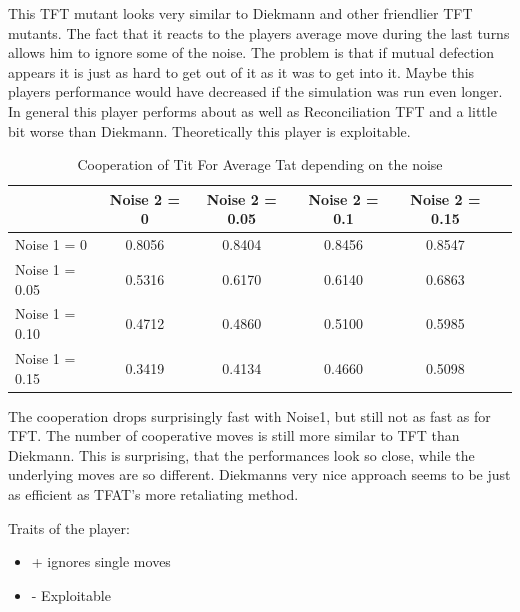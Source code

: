 \documentclass[11pt,twoside]{article}
\begin{document}
This TFT mutant looks very similar to Diekmann and other friendlier TFT mutants. The fact that it reacts to the players average move during the last turns allows him to ignore some of the noise. The problem is that if mutual defection appears it is just as hard to get out of it as it was to get into it. Maybe this players performance would have decreased if the simulation was run even longer. In general this player performs about as well as Reconciliation TFT and a little bit worse than Diekmann. Theoretically this player is exploitable. 

\begin{table}[h]
 \begin{center}
\caption{Cooperation of Tit For Average Tat depending on the noise} \vspace{3mm}
\begin{tabular}{|l|c|c|c|c|c|}
\hline
   	& Noise 2 = 0 & Noise 2 = 0.05& Noise 2 = 0.1& Noise 2 = 0.15 \\
  \hline
  Noise 1 = 0 	&    0.8056  &  0.8404  &  0.8456  &  0.8547 \\
 \hline
  Noise 1 = 0.05	 &     0.5316  &  0.6170 &   0.6140   & 0.6863 \\
 \hline
  Noise 1 = 0.10 	&    0.4712  &  0.4860  &  0.5100  &  0.5985 \\
 \hline
  Noise 1 = 0.15 	&       0.3419  &  0.4134 &   0.4660 &   0.5098 \\
 \hline
\end{tabular}
 \end{center}
\end{table}

The cooperation drops surprisingly fast with Noise1, but still not as fast as for TFT. The number of cooperative moves is still more similar to TFT than Diekmann. This is surprising, that the performances look so close, while the underlying moves are so different. Diekmanns very nice approach seems to be just as efficient as TFAT's more retaliating method. 

Traits of the player:

\renewcommand{\labelitemi}{}
\begin{itemize}
	\item + ignores single moves
	\item - Exploitable
\end{itemize}
\renewcommand{\labelitemi}{$\bullet$}

\newpage
\end{document}
